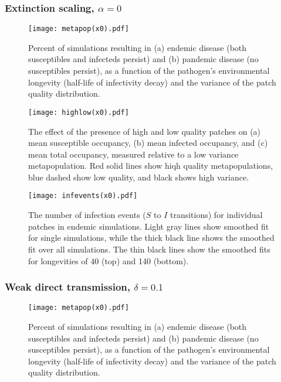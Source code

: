 \documentclass{svjour3}
\begin{document}
\clearpage

\subsubsection{Extinction scaling, $\alpha = 0$}

\begin{figure}[h!]
\centering
\texttt{[image: metapop(x0).pdf]}
\caption{Percent of simulations resulting in (a) endemic disease (both susceptibles and infecteds persist) and (b) pandemic disease (no susceptibles persist), as a function of the pathogen's environmental longevity (half-life of infectivity decay) and the variance of the patch quality distribution.}
\label{poutcome_x0}
\end{figure}   

\begin{figure}
\centering
\texttt{[image: highlow(x0).pdf]}
\caption{The effect of the presence of high and low quality patches on (a) mean susceptible occupancy, (b) mean infected occupancy, and (c) mean total occupancy, measured relative to  a low variance metapopulation.  Red solid lines show hiqh quality metapopulations, blue dashed show low quality, and black shows high variance.}
\label{sens_x0}
\end{figure}

\begin{figure}
\centering
\texttt{[image: infevents(x0).pdf]}
\caption{The number of infection events ($S$ to $I$ transitions) for individual patches in endemic simulations.  Light gray lines show smoothed fit for single simulations, while the thick black line shows the smoothed fit over all simulations.  The thin black lines show the smoothed fits for longevities of 40 (top) and 140 (bottom).}
\label{infections_x0}
\end{figure}

\clearpage

\subsubsection{Weak direct transmission, $\delta = 0.1$}

\begin{figure}[h!]
\centering
\texttt{[image: metapop(x0).pdf]}
\caption{Percent of simulations resulting in (a) endemic disease (both susceptibles and infecteds persist) and (b) pandemic disease (no susceptibles persist), as a function of the pathogen's environmental longevity (half-life of infectivity decay) and the variance of the patch quality distribution.}
\label{poutcome_x0}
\end{figure}   
\end{document}
